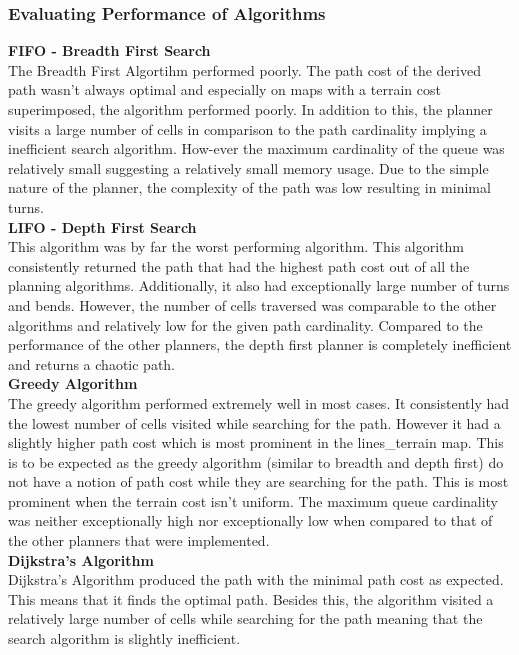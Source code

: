 \documentclass[a4paper,12pt]{article}
\begin{document}
			\subsubsection{Evaluating Performance of Algorithms}
				\textbf{FIFO - Breadth First Search}
				\\
				The Breadth First Algortihm performed poorly. The path cost of the derived path wasn't always optimal and especially on maps with a terrain cost superimposed, the algorithm performed poorly. In addition to this, the planner visits a large number of cells in comparison to the path cardinality implying a inefficient search algorithm. How-ever the maximum cardinality of the queue was relatively small suggesting a relatively small memory usage. Due to the simple nature of the planner, the complexity of the path was low resulting in minimal turns.
				\\
				\textbf{LIFO - Depth First Search}
				\\
				This algorithm was by far the worst performing algorithm. This algorithm consistently returned the path that had the highest path cost out of all the planning algorithms. Additionally, it also had exceptionally large number of turns and bends. However, the number of cells traversed was comparable to the other algorithms and relatively low for the given path cardinality. Compared to the performance of the other planners, the depth first planner is completely inefficient and returns a chaotic path.
				\\
				\textbf{Greedy Algorithm}
				\\
				The greedy algorithm performed extremely well in most cases. It consistently had the lowest number of cells visited while searching for the path. However it had a slightly higher path cost which is most prominent in the lines\_terrain map. This is to be expected as the greedy algorithm (similar to breadth and depth first) do not have a notion of path cost while they are searching for the path. This is most prominent when the terrain cost isn't uniform. The maximum queue cardinality was neither exceptionally high nor exceptionally low when compared to that of the other planners that were implemented. 
				\\
				\textbf{Dijkstra's Algorithm}
				\\
				Dijkstra's Algorithm produced the path with the minimal path cost as expected. This means that it finds the optimal path. Besides this, the algorithm visited a relatively large number of cells while searching for the path meaning that the search algorithm is slightly inefficient. 
\end{document}
